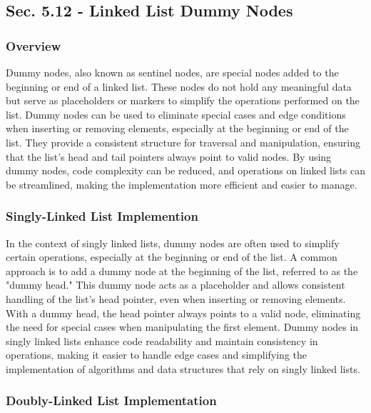\subsection*{Sec. 5.12 - Linked List Dummy Nodes}

\subsubsection{Overview}

Dummy nodes, also known as sentinel nodes, are special nodes added to the beginning or end of a linked list. These nodes do not hold any meaningful data but serve as placeholders or markers to simplify the operations performed on the list. Dummy nodes can be used to eliminate special cases and edge conditions when inserting or removing elements, 
especially at the beginning or end of the list. They provide a consistent structure for traversal and manipulation, ensuring that the list's head and tail pointers always point to valid nodes. By using dummy nodes, code complexity can be reduced, and operations on linked lists can be streamlined, making the implementation more efficient and easier 
to manage.

\subsubsection{Singly-Linked List Implemention}

In the context of singly linked lists, dummy nodes are often used to simplify certain operations, especially at the beginning or end of the list. A common approach is to add a dummy node at the beginning of the list, referred to as the "dummy head." This dummy node acts as a placeholder and allows consistent handling of the list's head pointer, even 
when inserting or removing elements. With a dummy head, the head pointer always points to a valid node, eliminating the need for special cases when manipulating the first element. Dummy nodes in singly linked lists enhance code readability and maintain consistency in operations, making it easier to handle edge cases and simplifying the implementation 
of algorithms and data structures that rely on singly linked lists.

\subsubsection{Doubly-Linked List Implementation}

